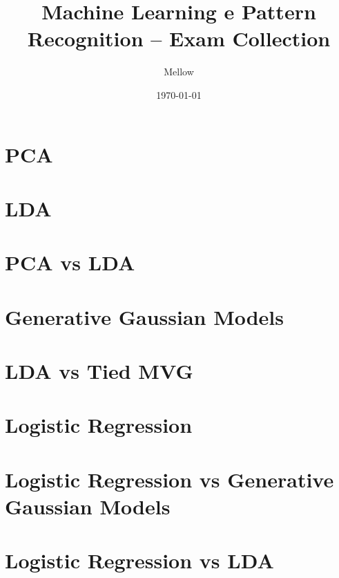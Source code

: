 \documentclass[a4paper,12pt]{article}
\title{Machine Learning e Pattern Recognition -- Exam Collection}
\author{Mellow}
\date{\today}
\begin{document}
\setlength{\parindent}{0pt}  %
\setlength{\parskip}{0.7em}  %

\maketitle

\tableofcontents

\newpage

\section{PCA}


\section{LDA}


\section{PCA vs LDA}


\section{Generative Gaussian Models}


\section{LDA vs Tied MVG}


\section{Logistic Regression}


\section{Logistic Regression vs Generative Gaussian Models}


\section{Logistic Regression vs LDA}

\end{document}
